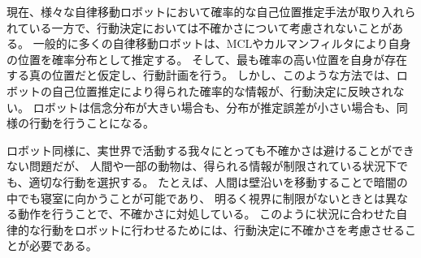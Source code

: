 
現在、様々な自律移動ロボットにおいて確率的な自己位置推定手法が取り入れられている一方で、行動決定においては不確かさについて考慮されないことがある。
一般的に多くの自律移動ロボットは、MCLやカルマンフィルタにより自身の位置を確率分布として推定する。
そして、最も確率の高い位置を自身が存在する真の位置だと仮定し、行動計画を行う。
しかし、このような方法では、ロボットの自己位置推定により得られた確率的な情報が、行動決定に反映されない。
ロボットは信念分布が大きい場合も、分布が推定誤差が小さい場合も、同様の行動を行うことになる。

ロボット同様に、実世界で活動する我々にとっても不確かさは避けることができない問題だが、
人間や一部の動物は、得られる情報が制限されている状況下でも、適切な行動を選択する。
たとえば、人間は壁沿いを移動することで暗闇の中でも寝室に向かうことが可能であり、
明るく視界に制限がないときとは異なる動作を行うことで、不確かさに対処している。
このように状況に合わせた自律的な行動をロボットに行わせるためには、行動決定に不確かさを考慮させることが必要である。



